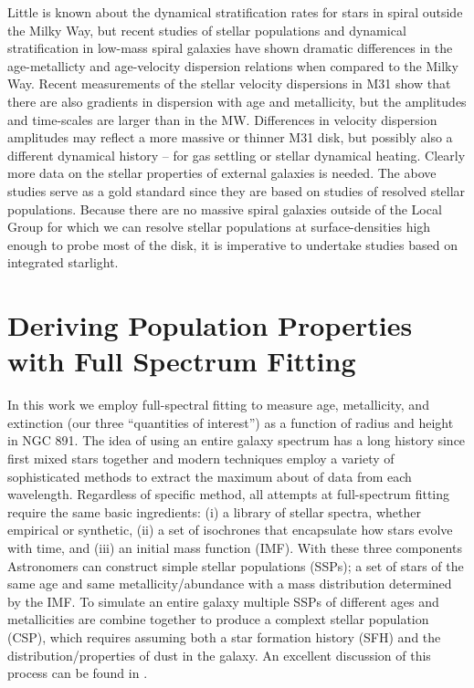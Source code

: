 Little is known about the dynamical stratification rates for stars in
spiral outside the Milky Way, but recent studies of stellar
populations and dynamical stratification in low-mass spiral galaxies
\citep{Seth05a,Bernard15} have shown dramatic differences in the
age-metallicty and age-velocity dispersion relations when compared to
the Milky Way. Recent measurements of the stellar velocity dispersions
in M31 \citep{Dorman15} show that there are also gradients in
dispersion with age and metallicity, but the amplitudes and
time-scales are larger than in the MW. Differences in velocity
dispersion amplitudes may reflect a more massive or thinner M31 disk,
but possibly also a different dynamical history -- for gas settling or
stellar dynamical heating. Clearly more data on the stellar properties
of external galaxies is needed. The above studies serve as a gold
standard since they are based on studies of resolved stellar
populations. Because there are no massive spiral galaxies outside of
the Local Group for which we can resolve stellar populations at
surface-densities high enough to probe most of the disk, it is
imperative to undertake studies based on integrated starlight.

\section{Deriving Population Properties with Full Spectrum Fitting}
In this work we employ full-spectral fitting to measure age,
metallicity, and extinction (our three ``quantities of interest'') as
a function of radius and height in NGC 891. The idea of using an
entire galaxy spectrum has a long history since \citet{Spinrad71}
first mixed stars together and modern techniques employ a variety of
sophisticated methods to extract the maximum about of data from each
wavelength. Regardless of specific method, all attempts at
full-spectrum fitting require the same basic ingredients: (i) a
library of stellar spectra, whether empirical or synthetic, (ii) a set
of isochrones that encapsulate how stars evolve with time, and (iii)
an initial mass function (IMF). With these three components
Astronomers can construct simple stellar populations (SSPs); a set of
stars of the same age and same metallicity/abundance with a mass
distribution determined by the IMF. To simulate an entire galaxy
multiple SSPs of different ages and metallicities are combine together
to produce a complext stellar population (CSP), which requires
assuming both a star formation history (SFH) and the
distribution/properties of dust in the galaxy. An excellent discussion
of this process can be found in \citet[especially his Figure
  1]{Conroy13}.

